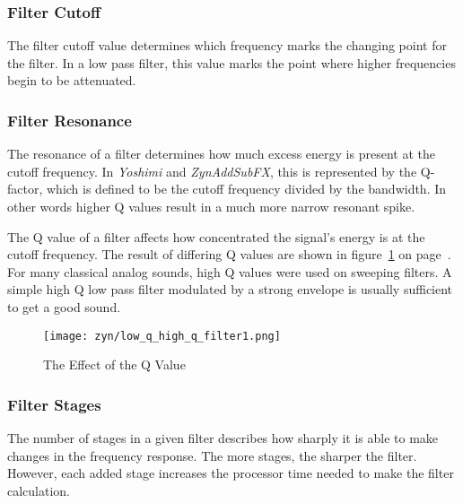 \subsubsection{Filter Cutoff}
\label{subsubsec:filter_cutoff}

   The filter cutoff value determines which frequency marks the changing
   point for the filter. In a low pass filter, this value marks the point
   where higher frequencies begin to be attenuated.

\subsubsection{Filter Resonance}
\label{subsubsec:filter_resonance}

   The resonance of a filter determines how much excess energy is present at
   the cutoff frequency. In \textsl{Yoshimi} and \textsl{ZynAddSubFX},
   this is represented by the Q-factor,
   which is defined to be the cutoff frequency divided by the bandwidth. In
   other words higher Q values result in a much more narrow resonant spike.

   The Q value of a filter affects how concentrated
   the signal’s energy is at the cutoff frequency. The result of differing Q
   values are shown in figure~\ref{fig:low_q_vs_high_q} on
   page~\pageref{fig:low_q_vs_high_q}.
   For many classical analog sounds, high Q values were used on sweeping
   filters. A simple high Q low pass filter modulated by a strong envelope is
   usually sufficient to get a good sound.

\begin{figure}[H]
   \centering 
   \texttt{[image: zyn/low\_q\_high\_q\_filter1.png]}
   \caption[Low Q vs. High Q]{The Effect of the Q Value}
   \label{fig:low_q_vs_high_q} 
\end{figure}

\subsubsection{Filter Stages}
\label{subsubsec:filter_stages}

   The number of stages in a given filter describes how sharply it is able to
   make changes in the frequency response.
   The more stages, the sharper the filter.
   However, each added stage increases the processor time needed to make the
   filter calculation.

